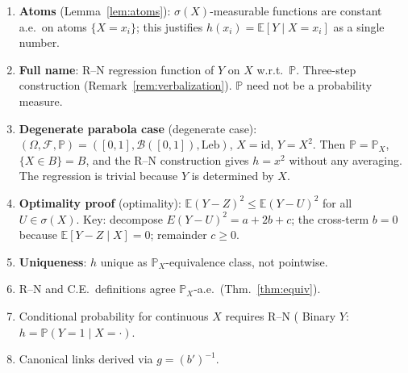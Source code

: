 \documentclass[12pt, a4paper]{article}
\theoremstyle{definition}
\newcommand{\E}{\mathbb{E}}
\newcommand{\Prob}{\mathbb{P}}
\newcommand{\borel}{\mathcal{B}}
\newcommand{\sF}{\mathcal{F}}
\newcommand{\Leb}{\mathrm{Leb}}
\begin{document}
\begin{enumerate}
  \item \textbf{Atoms} (Lemma~\ref{lem:atoms}): $\sigma(X)$-measurable
    functions are constant a.e.\ on atoms $\{X=x_i\}$; this justifies
    $h(x_i)=\E[Y\mid X=x_i]$ as a single number.

  \item \textbf{Full name}: R--N regression function of $Y$ on $X$
    w.r.t.\ $\Prob$. Three-step construction
    (Remark~\ref{rem:verbalization}). $\Prob$ need not be a
    probability measure.

  \item \textbf{Degenerate parabola case} (degenerate case):
    $(\Omega,\sF,\Prob)=([0,1],\borel([0,1]),\Leb)$,
    $X=\mathrm{id}$, $Y=X^2$. Then $\Prob=\Prob_X$,
    $\{X\in B\}=B$, and the R--N construction gives $h=x^2$
    without any averaging. The regression is trivial because $Y$
    is determined by $X$.

  \item \textbf{Optimality proof} (optimality):
    $\E(Y-Z)^2\leq\E(Y-U)^2$ for all $U\in\sigma(X)$.
    Key: decompose $E(Y-U)^2=a+2b+c$; the cross-term $b=0$ because
    $\E[Y-Z\mid X]=0$; remainder $c\geq 0$.

  \item \textbf{Uniqueness}: $h$ unique as $\Prob_X$-equivalence class,
    not pointwise.

  \item R--N and C.E.\ definitions agree $\Prob_X$-a.e.\
    (Thm.~\ref{thm:equiv}).

  \item Conditional probability for continuous $X$ requires R--N
    ( Binary $Y$: $h=\Prob(Y=1\mid X=\cdot)$.

  \item Canonical links derived via $g=(b')^{-1}$.
\end{enumerate}

\appendix
\end{document}

